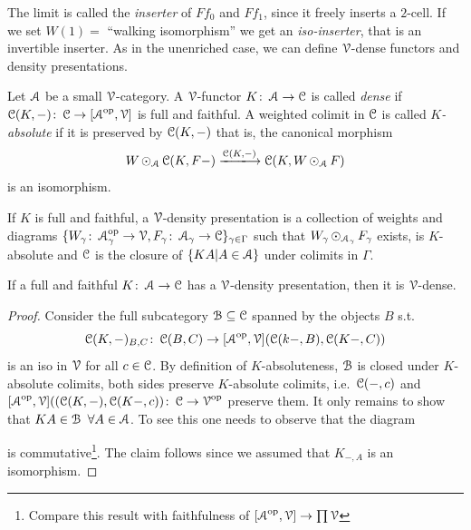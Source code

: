 \documentclass[a4paper,11pt,oneside,openany]{scrbook}
\begin{document}
The limit is called the \emph{inserter} of $Ff_0$ and $Ff_1$, since it freely inserts a $2$-cell. If we set $W(1)=$  ``walking isomorphism'' we get an \emph{iso-inserter}, that is an invertible inserter.
As in the unenriched case, we can define $\V$-dense functors and density presentations. 
\begin{defn}
   Let $\A$ be a small $\V$-category. A $\V$-functor $K\from\A\to\C$ is called \emph{dense} if $\C(K,-)\from\C\to[\A^{\op},\V]$ is full and faithful. A weighted colimit in $\C$ is called \emph{$K$-absolute} if it is preserved by $\C(K,-)$ that is, the canonical morphism
   $$W\copw_{\A}\C(K,F-)\xlongrightarrow{\C(K,-)}\C(K,W\copw_{\A} F)$$
   is an isomorphism. 
\end{defn}
		
\begin{defn}
   If $K$ is full and faithful, a $\V$-density presentation is a collection of weights and diagrams $\{W_\gamma\colon\A^{\op}_\gamma\to\V, F_\gamma\colon\A_\gamma\to\C\}_{\gamma\in\Gamma}$ such that $W_\gamma\copw_{\A_\gamma}F_\gamma$ exists, is $K$-absolute and $\C$ is the closure of $\{KA|A\in\A\}$ under colimits in $\Gamma$.
\end{defn}		
		\begin{prop}
		   If a full and faithful $K\from\A\to\C$ has a $\V$-density presentation, then it is $\V$-dense.
		\end{prop}
		\begin{proof}
		Consider the full subcategory $\B\subseteq\C$ spanned by the objects $B$ s.t.\ $$\C(K,-)_{B,C}\colon\C(B,C)\to[\A^{\op},\V](\C(k-,B),\C(K-,C))$$ is an iso in $\V$ for all $c\in\C$. By definition of $K$-absoluteness, $\B$ is closed under $K$-absolute colimits, both sides preserve $K$-absolute colimits, i.e.\ $\C(-,c)$ and $[\A^{\op},\V]((\C(K,-),\C(K-,c))\colon\C\to\V^{\op}$ preserve them. It only remains to show that $KA\in\B\ \forall A\in\A$. To see this one needs to observe that the diagram
		 \begin{center}
   \end{center}
is commutative\footnote{Compare this result with faithfulness of $[\A^{\op},\V]\to\prod\V$ }. The claim follows since we assumed that $K_{-,A}$ is an isomorphism.
		\end{proof}
\end{document}
